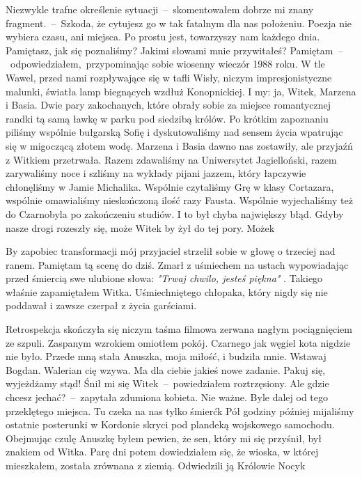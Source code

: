 \documentclass[../MAIN.tex]{subfiles}
\begin{document}
\sx Niezwykle trafne określenie sytuacji~--~skomentowałem
dobrze
mi znany fragment.~--~Szkoda, że cytujesz go w tak fatalnym dla
nas położeniu.
\xx Poezja nie wybiera czasu, ani miejsca. Po prostu jest,
towarzyszy nam każdego dnia. Pamiętasz, jak się poznaliśmy?
Jakimi słowami mnie przywitałeś?
\xx Pamiętam~--~odpowiedziałem,~przypominając sobie wiosenny
wieczór 1988 roku.
\qd
\vspace{-.6em}
W tle Wawel, przed nami rozpływające się w
tafli Wisły, niczym impresjonistyczne malunki, światła lamp
biegnących wzdłuż Konopnickiej. I my: ja, Witek, Marzena i
Basia. Dwie pary zakochanych, które obrały sobie za miejsce
romantycznej randki tą samą ławkę w parku pod siedzibą królów.
Po krótkim zapoznaniu piliśmy wspólnie bułgarską Sofię i
dyskutowaliśmy nad sensem życia wpatrując się w migoczącą
złotem wodę. Marzena i Basia dawno nas zostawiły, ale przyjaźń
z Witkiem przetrwała. Razem zdawaliśmy na Uniwersytet
Jagielloński, razem zarywaliśmy noce i szliśmy na wykłady
pijani jazzem, który łapczywie chłonęliśmy w Jamie Michalika.
Wspólnie czytaliśmy Grę w klasy Cortazara, wspólnie omawialiśmy
nieskończoną ilość razy Fausta. Wspólnie wyjechaliśmy też do
Czarnobyla po zakończeniu studiów. I to był chyba największy
błąd. Gdyby nasze drogi rozeszły się, może Witek by żył do tej
pory. Może\3k

By zapobiec transformacji mój przyjaciel strzelił sobie w głowę
o trzeciej nad ranem. Pamiętam tą scenę do dziś. Zmarł z
uśmiechem na ustach wypowiadając przed śmiercią swe ulubione
słowa: \emph{"Trwaj chwilo, jesteś piękna"} . Takiego właśnie
zapamiętałem Witka. Uśmiechniętego chłopaka, który nigdy się
nie poddawał i zawsze czerpał z życia garściami.

Retrospekcja skończyła się niczym taśma filmowa zerwana nagłym
pociągnięciem ze szpuli. Zaspanym wzrokiem omiotłem pokój.
Czarnego jak węgiel kota nigdzie nie było. Przede mną stała
Anuszka, moja miłość, i budziła mnie.
%
\sx Wstawaj Bogdan. Walerian cię wzywa. Ma dla ciebie jakieś
nowe
zadanie.
\xx Pakuj się, wyjeżdżamy stąd! Śnił mi się
Witek~--~powiedziałem
roztrzęsiony.
\xx Ale gdzie chcesz jechać?~--~zapytała zdumiona kobieta.
\xx Nie ważne. Byle dalej od tego przeklętego miejsca. Tu czeka
na nas tylko śmierć\3k
\qd
Pół godziny później mijaliśmy ostatnie posterunki w Kordonie
skryci pod plandeką wojskowego samochodu. Obejmując czulę
Anuszkę byłem pewien, że sen, który mi się przyśnił, był
znakiem od Witka. Parę dni potem dowiedziałem się, że wioska, w
której mieszkałem, została zrównana z ziemią. Odwiedzili ją
Królowie Nocy\3k
\end{document}
